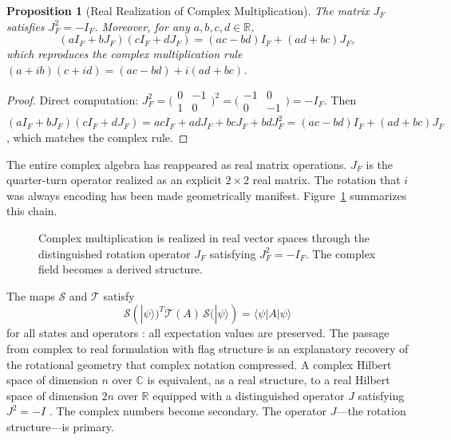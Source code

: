 \documentclass[12pt]{article}
\newtheorem{proposition}[theorem]{Proposition}
\begin{document}
\begin{proposition}[Real Realization of Complex Multiplication]
\label{prop:real-complex}
The matrix $J_F$ satisfies $J_F^2 = -I_F$. Moreover, for any $a, b, c, d \in \mathbb{R}$,
\[
(aI_F + bJ_F)(cI_F + dJ_F) = (ac - bd)I_F + (ad + bc)J_F,
\]
which reproduces the complex multiplication rule $(a + ib)(c + id) = (ac-bd) + i(ad+bc)$.
\end{proposition}

\begin{proof}
Direct computation:
$J_F^2 = \bigl(\begin{smallmatrix}0&-1\\1&0\end{smallmatrix}\bigr)^2
= \bigl(\begin{smallmatrix}-1&0\\0&-1\end{smallmatrix}\bigr) = -I_F$.
Then $(aI_F+bJ_F)(cI_F+dJ_F) = acI_F + adJ_F + bcJ_F + bdJ_F^2
= (ac-bd)I_F + (ad+bc)J_F$,
which matches the complex rule.
\end{proof}

The entire complex algebra has reappeared as real matrix operations. $J_F$ is the quarter-turn operator realized as an explicit $2\times2$ real matrix. The rotation that $i$ was always encoding has been made geometrically manifest. Figure~\ref{fig:real-complex} summarizes this chain.

\begin{figure}[ht]
\centering
{}
\caption{Complex multiplication is realized in real vector spaces through
the distinguished rotation operator $J_F$ satisfying $J_F^2 = -I_F$. The
complex field becomes a derived structure.}
\label{fig:real-complex}
\end{figure}

The maps $\mathcal{S}$ and $\mathcal{T}$ satisfy
\[
\mathcal{S}(|\psi\rangle)^T \mathcal{T}(A)\, \mathcal{S}(|\psi\rangle) = \langle\psi|A|\psi\rangle
\]
for all states and operators \cite{Barrios}: all expectation values are preserved. The passage from complex to real formulation with flag structure is an explanatory recovery of the rotational geometry that complex notation compressed. A complex Hilbert space of dimension $n$ over $\mathbb{C}$ is equivalent, as a real structure, to a real Hilbert space of dimension $2n$ over $\mathbb{R}$ equipped with a distinguished operator $J$ satisfying $J^2 = -I$ \cite{Hall,Dyson,Arnold}. The complex numbers become secondary. The operator $J$---the rotation structure---is primary.
\end{document}
